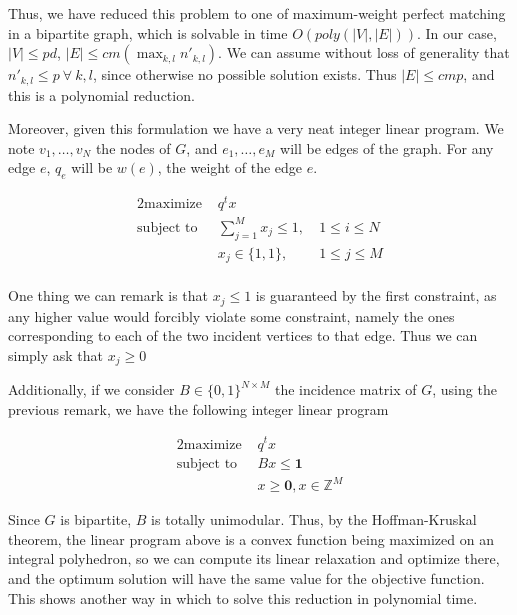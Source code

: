 Thus, we have reduced this problem to one of maximum-weight perfect matching in a bipartite graph, which is solvable in time $O(poly(|V|, |E|))$. In our case, $|V| \le pd$, $|E| \le cm(\max_{k, l} n'_{k, l})$. We can assume without loss of generality that $n'_{k, l} \le p\ \forall\ k, l$, since otherwise no possible solution exists. Thus $|E| \le cmp$, and this is a polynomial reduction.

Moreover, given this formulation we have a very neat integer linear program. We note $v_1, \dots, v_N$ the nodes of $G$, and $e_1, \dots, e_M$ will be edges of the graph. For any edge $e$, $q_e$ will be $w(e)$, the weight of the edge $e$.

\begin{alignat*}{2}
  \text{maximize }   & q^t x \\
  \text{subject to } & \sum_{j=1}^M x_j \le 1, \ & 1 \le i \le N\\
                     & x_j \in \{1, 1\}, \ & 1 \le j \le M\\
\end{alignat*}

One thing we can remark is that $x_j \le 1$ is guaranteed by the first constraint, as any higher value would forcibly violate some constraint, namely the ones corresponding to each of the two incident vertices to that edge. Thus we can simply ask that $x_j \ge 0$

Additionally, if we consider $B \in \{0, 1\}^{N \times M}$ the incidence matrix of $G$, using the previous remark, we have the following integer linear program

\begin{alignat*}{2}
  \text{maximize } & q^t x \\
  \text{subject to } & Bx \le \mathbf{1}\\
                     & x \ge \mathbf{0}, x \in \mathbb{Z}^M
\end{alignat*}

Since $G$ is bipartite, $B$ is totally unimodular. Thus, by the Hoffman-Kruskal theorem, the linear program above is a convex function being maximized on an integral polyhedron, so we can compute its linear relaxation and optimize there, and the optimum solution will have the same value for the objective function. This shows another way in which to solve this reduction in polynomial time.
